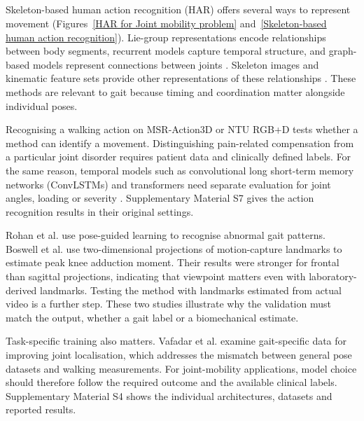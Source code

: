 \documentclass[12pt,nopreprintline]{elsarticle}
\begin{document}
\subsection{}
\label{sec:har_synthesis}
\begin{revision}
Skeleton-based human action recognition (HAR) offers several ways to represent movement (Figures~\ref{HAR for Joint mobility problem} and~\ref{Skeleton-based human action recognition}). Lie-group representations encode relationships between body segments, recurrent models capture temporal structure, and graph-based models represent connections between joints \cite{vemulapalli2014human,du2015hierarchical,ahmad2019action}. Skeleton images and kinematic feature sets provide other representations of these relationships \cite{caetano2019skeleton,ke2017skeletonnet,ahad2021action}. These methods are relevant to gait because timing and coordination matter alongside individual poses.

Recognising a walking action on MSR-Action3D or NTU RGB+D tests whether a method can identify a movement. Distinguishing pain-related compensation from a particular joint disorder requires patient data and clinically defined labels. For the same reason, temporal models such as convolutional long short-term memory networks (ConvLSTMs) and transformers need separate evaluation for joint angles, loading or severity \cite{yadav2022skeleton,suhendar2022skeletal}. Supplementary Material S7 gives the action recognition results in their original settings.

Rohan et al. \cite{rohan2020human} use pose-guided learning to recognise abnormal gait patterns. Boswell et al. \cite{boswell2021neural} use two-dimensional projections of motion-capture landmarks to estimate peak knee adduction moment. Their results were stronger for frontal than sagittal projections, indicating that viewpoint matters even with laboratory-derived landmarks. Testing the method with landmarks estimated from actual video is a further step. These two studies illustrate why the validation must match the output, whether a gait label or a biomechanical estimate.

Task-specific training also matters. Vafadar et al. \cite{vafadar2021novel} examine gait-specific data for improving joint localisation, which addresses the mismatch between general pose datasets and walking measurements. For joint-mobility applications, model choice should therefore follow the required outcome and the available clinical labels. Supplementary Material S4 shows the individual architectures, datasets and reported results.
\end{revision}
\end{document}
